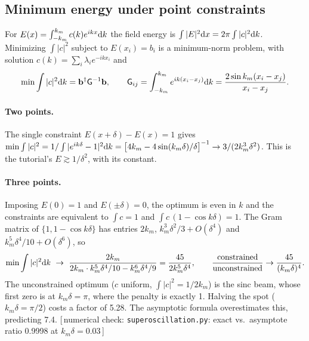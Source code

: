 \documentclass[11pt,letterpaper]{article}
\newcommand{\vect}[1]{\mathbf{#1}}
\newcommand{\code}[1]{\texttt{\small #1}}
\newcommand{\numcheck}[1]{\hfill{\small\color{green!40!black}[\,numerical check: #1\,]}}
\begin{document}
\subsection{Minimum energy under point constraints}
For $E(x)=\int_{-k_m}^{k_m}c(k)e^{ikx}{\rm d}k$ the field energy is $\int|E|^2{\rm d}x=2\pi\int|c|^2{\rm d}k$. Minimizing $\int|c|^2$ subject to $E(x_i)=b_i$ is a minimum-norm problem, with solution $c(k)=\sum_i\lambda_ie^{-ikx_i}$ and
\begin{align}
    \min\int|c|^2{\rm d}k = \vect b^\dagger\mathsf{G}^{-1}\vect b,\qquad \mathsf{G}_{ij}=\int_{-k_m}^{k_m}e^{ik(x_i-x_j)}{\rm d}k=\frac{2\sin k_m(x_i-x_j)}{x_i-x_j}.
\end{align}
\paragraph{Two points.} The single constraint $E(x+\delta)-E(x)=1$ gives $\min\int|c|^2=1/\int|e^{ik\delta}-1|^2{\rm d}k=\big[4k_m-4\sin(k_m\delta)/\delta\big]^{-1}\to3/(2k_m^3\delta^2)$. This is the tutorial's $E\gtrsim1/\delta^2$, with its constant.

\paragraph{Three points.} Imposing $E(0)=1$ and $E(\pm\delta)=0$, the optimum is even in $k$ and the constraints are equivalent to $\int c=1$ and $\int c\,(1-\cos k\delta)=1$. The Gram matrix of $\{1,1-\cos k\delta\}$ has entries $2k_m$, $k_m^3\delta^2/3+O(\delta^4)$ and $k_m^5\delta^4/10+O(\delta^6)$, so
\begin{align}
    \min\int|c|^2{\rm d}k\ \to\ \frac{2k_m}{2k_m\cdot k_m^5\delta^4/10-k_m^6\delta^4/9}=\frac{45}{2k_m^5\delta^4},
    \qquad\frac{\text{constrained}}{\text{unconstrained}}\to\frac{45}{(k_m\delta)^4}.
\end{align}
The unconstrained optimum ($c$ uniform, $\int|c|^2=1/2k_m$) is the sinc beam, whose first zero is at $k_m\delta=\pi$, where the penalty is exactly 1. Halving the spot ($k_m\delta=\pi/2$) costs a factor of 5.28. The asymptotic formula overestimates this, predicting 7.4.
\numcheck{\code{superoscillation.py}: exact vs.\ asymptote ratio 0.9998 at $k_m\delta=0.03$}
\end{document}
